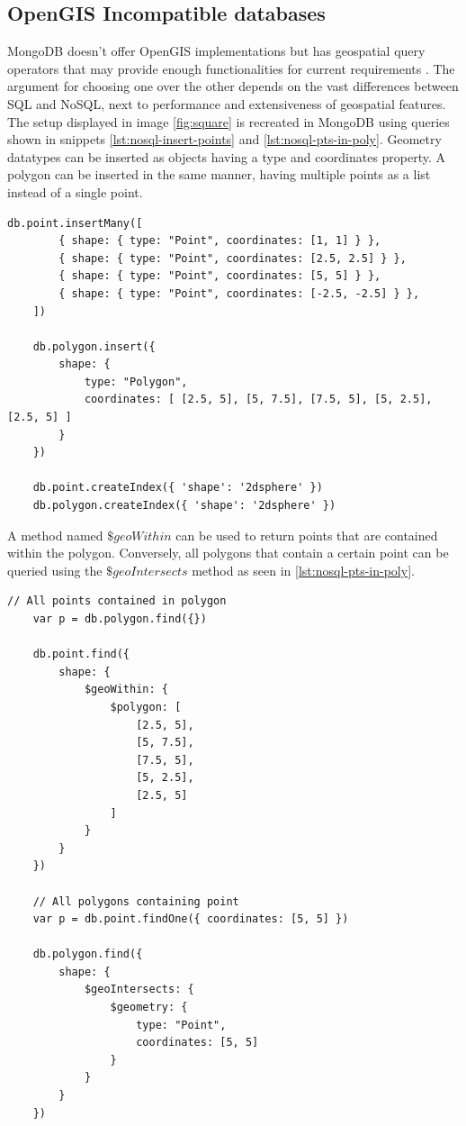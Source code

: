 \subsection{OpenGIS Incompatible databases}
MongoDB doesn’t offer OpenGIS implementations but has geospatial query operators that may provide enough functionalities for current requirements \cite{MongoDB}. The argument for choosing one over the other depends on the vast differences between SQL and NoSQL, next to performance and extensiveness of geospatial features. The setup displayed in image \ref{fig:square} is recreated in MongoDB using queries shown in snippets \ref{lst:nosql-insert-points} and \ref{lst:nosql-pts-in-poly}. Geometry datatypes can be inserted as objects having a type and coordinates property. A polygon can be inserted in the same manner, having multiple points as a list instead of a single point.

\begin{lstlisting}[caption={Insert four points and one polygon in MongoDB.}, label={lst:nosql-insert-points}]
	db.point.insertMany([
		{ shape: { type: "Point", coordinates: [1, 1] } },
		{ shape: { type: "Point", coordinates: [2.5, 2.5] } },
		{ shape: { type: "Point", coordinates: [5, 5] } },
		{ shape: { type: "Point", coordinates: [-2.5, -2.5] } },
	])

	db.polygon.insert({
		shape: {
			type: "Polygon",
			coordinates: [ [2.5, 5], [5, 7.5], [7.5, 5], [5, 2.5], [2.5, 5] ]
		}
	})

	db.point.createIndex({ 'shape': '2dsphere' })
	db.polygon.createIndex({ 'shape': '2dsphere' })
\end{lstlisting}

A method named $\$geoWithin$ can be used to return points that are contained within the polygon. Conversely, all polygons that contain a certain point can be queried using the $\$geoIntersects$ method as seen in \ref{lst:nosql-pts-in-poly}.

\begin{lstlisting}[caption={Select points contained in polygon, and all polygons containing a point in MongoDB.}, label={lst:nosql-pts-in-poly}]
	// All points contained in polygon
	var p = db.polygon.find({})

	db.point.find({
		shape: {
			$geoWithin: {
				$polygon: [
					[2.5, 5],
					[5, 7.5],
					[7.5, 5],
					[5, 2.5],
					[2.5, 5]
				]
			}
		}
	})

	// All polygons containing point
	var p = db.point.findOne({ coordinates: [5, 5] })

	db.polygon.find({
		shape: {
			$geoIntersects: {
				$geometry: {
					type: "Point",
					coordinates: [5, 5]
				}
			}
		}
	})
\end{lstlisting}

